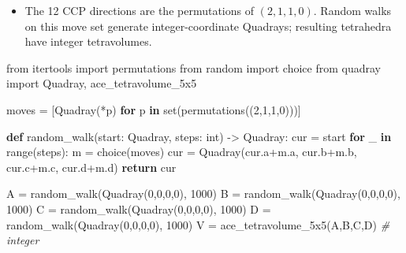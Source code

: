 \documentclass[
  10pt,
]{article}
\newenvironment{Shaded}{}{}
\newcommand{\BuiltInTok}[1]{#1}
\newcommand{\CommentTok}[1]{\textcolor[rgb]{0.38,0.63,0.69}{\textit{#1}}}
\newcommand{\ControlFlowTok}[1]{\textcolor[rgb]{0.00,0.44,0.13}{\textbf{#1}}}
\newcommand{\DecValTok}[1]{\textcolor[rgb]{0.25,0.63,0.44}{#1}}
\newcommand{\ImportTok}[1]{#1}
\newcommand{\KeywordTok}[1]{\textcolor[rgb]{0.00,0.44,0.13}{\textbf{#1}}}
\newcommand{\NormalTok}[1]{#1}
\newcommand{\OperatorTok}[1]{\textcolor[rgb]{0.40,0.40,0.40}{#1}}
\providecommand{\tightlist}{%
  \setlength{\itemsep}{0pt}\setlength{\parskip}{0pt}}
\begin{document}
\begin{itemize}
\tightlist
\item
  The 12 CCP directions are the permutations of \((2,1,1,0)\). Random
  walks on this move set generate integer-coordinate Quadrays; resulting
  tetrahedra have integer tetravolumes.
\end{itemize}

\begin{Shaded}
\begin{Highlighting}[]
\ImportTok{from}\NormalTok{ itertools }\ImportTok{import}\NormalTok{ permutations}
\ImportTok{from}\NormalTok{ random }\ImportTok{import}\NormalTok{ choice}
\ImportTok{from}\NormalTok{ quadray }\ImportTok{import}\NormalTok{ Quadray, ace\_tetravolume\_5x5}

\NormalTok{moves }\OperatorTok{=}\NormalTok{ [Quadray(}\OperatorTok{*}\NormalTok{p) }\ControlFlowTok{for}\NormalTok{ p }\KeywordTok{in} \BuiltInTok{set}\NormalTok{(permutations((}\DecValTok{2}\NormalTok{,}\DecValTok{1}\NormalTok{,}\DecValTok{1}\NormalTok{,}\DecValTok{0}\NormalTok{)))]}

\KeywordTok{def}\NormalTok{ random\_walk(start: Quadray, steps: }\BuiltInTok{int}\NormalTok{) }\OperatorTok{{-}\textgreater{}}\NormalTok{ Quadray:}
\NormalTok{    cur }\OperatorTok{=}\NormalTok{ start}
    \ControlFlowTok{for}\NormalTok{ \_ }\KeywordTok{in} \BuiltInTok{range}\NormalTok{(steps):}
\NormalTok{        m }\OperatorTok{=}\NormalTok{ choice(moves)}
\NormalTok{        cur }\OperatorTok{=}\NormalTok{ Quadray(cur.a}\OperatorTok{+}\NormalTok{m.a, cur.b}\OperatorTok{+}\NormalTok{m.b, cur.c}\OperatorTok{+}\NormalTok{m.c, cur.d}\OperatorTok{+}\NormalTok{m.d)}
    \ControlFlowTok{return}\NormalTok{ cur}

\NormalTok{A }\OperatorTok{=}\NormalTok{ random\_walk(Quadray(}\DecValTok{0}\NormalTok{,}\DecValTok{0}\NormalTok{,}\DecValTok{0}\NormalTok{,}\DecValTok{0}\NormalTok{), }\DecValTok{1000}\NormalTok{)}
\NormalTok{B }\OperatorTok{=}\NormalTok{ random\_walk(Quadray(}\DecValTok{0}\NormalTok{,}\DecValTok{0}\NormalTok{,}\DecValTok{0}\NormalTok{,}\DecValTok{0}\NormalTok{), }\DecValTok{1000}\NormalTok{)}
\NormalTok{C }\OperatorTok{=}\NormalTok{ random\_walk(Quadray(}\DecValTok{0}\NormalTok{,}\DecValTok{0}\NormalTok{,}\DecValTok{0}\NormalTok{,}\DecValTok{0}\NormalTok{), }\DecValTok{1000}\NormalTok{)}
\NormalTok{D }\OperatorTok{=}\NormalTok{ random\_walk(Quadray(}\DecValTok{0}\NormalTok{,}\DecValTok{0}\NormalTok{,}\DecValTok{0}\NormalTok{,}\DecValTok{0}\NormalTok{), }\DecValTok{1000}\NormalTok{)}
\NormalTok{V }\OperatorTok{=}\NormalTok{ ace\_tetravolume\_5x5(A,B,C,D)            }\CommentTok{\# integer}
\end{Highlighting}
\end{Shaded}
\end{document}
